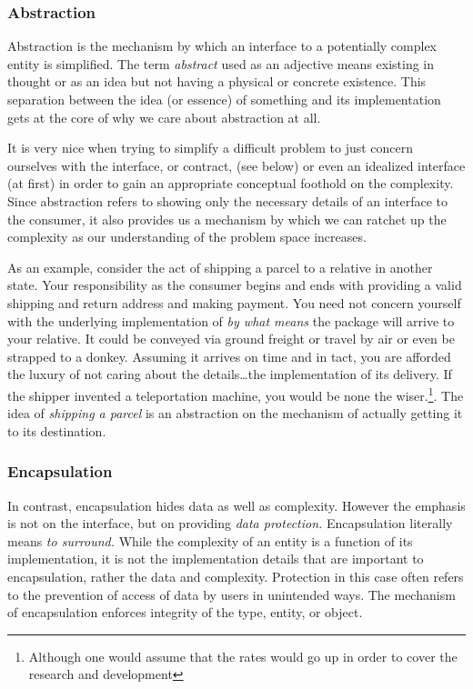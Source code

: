 \documentclass[jou,apacite]{apa6}
\begin{document}
\subsubsection{Abstraction}
Abstraction is the mechanism by which an interface to a potentially complex entity is simplified.  The term \emph{abstract} used as an adjective means existing in thought or as an idea but not having a physical or concrete existence.  This separation between the idea (or essence) of something and its implementation gets at the core of why we care about abstraction at all.  

It is very nice when trying to simplify a difficult problem to just concern ourselves with the interface, or contract, (see below) or even an idealized interface (at first) in order to gain an appropriate conceptual foothold on the complexity.  Since abstraction refers to showing only the necessary details of an interface to the consumer, it also provides us a mechanism by which we can ratchet up the complexity as our understanding of the problem space increases.

As an example, consider the act of shipping a parcel to a relative in another state.  Your responsibility as the consumer begins and ends with providing a valid shipping and return address and making payment.  You need not concern yourself with the underlying implementation of \emph{by what means} the package will arrive to your relative.  It could be conveyed via ground freight or travel by air or even be strapped to a donkey.  Assuming it arrives on time and in tact, you are afforded the luxury of not caring about the details\dots the implementation of its delivery.  If the shipper invented a teleportation machine, you would be none the wiser.\footnote{Although one would assume that the rates would go up in order to cover the research and development}.  The idea of \emph{shipping a parcel} is an abstraction on the mechanism of actually getting it to its destination.

\subsubsection{Encapsulation}
In contrast, encapsulation hides  data as well as complexity.  However the emphasis is not on the interface, but on providing \emph{data protection.}  Encapsulation literally means \emph{to surround.}  While the complexity of an entity is a function of its implementation, it is not the implementation details that are important to encapsulation, rather the data and complexity.  Protection in this case often refers to the prevention of access of data by users in unintended ways.  The mechanism of encapsulation enforces integrity of the type, entity, or object.
\end{document}
